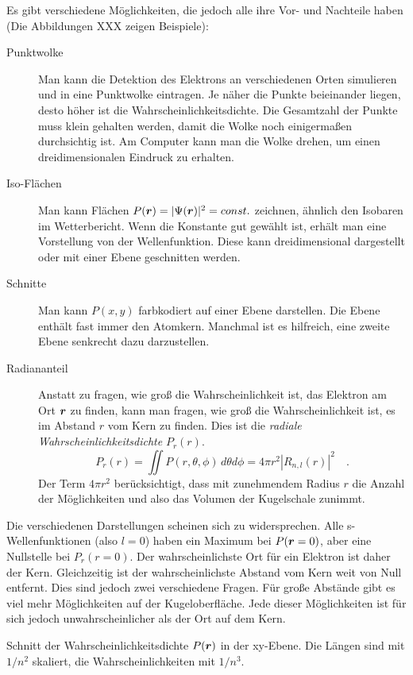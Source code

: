 Es gibt verschiedene Möglichkeiten, die jedoch alle ihre Vor- und Nachteile haben (Die Abbildungen XXX zeigen Beispiele):
\begin{description}
    \item[Punktwolke] Man kann die Detektion des Elektrons an verschiedenen Orten simulieren und in eine Punktwolke eintragen. Je näher die Punkte beieinander liegen, desto höher ist die Wahrscheinlichkeitsdichte. Die Gesamtzahl der Punkte muss klein gehalten werden, damit die Wolke noch einigermaßen durchsichtig ist. Am Computer kann man die Wolke drehen, um einen dreidimensionalen Eindruck zu erhalten.
    \item[Iso-Flächen] Man kann Flächen $P(\boldsymbol{r}) = |\Psi(\boldsymbol{r})|^2 = const.$ zeichnen, ähnlich den Isobaren im Wetterbericht. Wenn die Konstante gut gewählt ist, erhält man eine Vorstellung von der Wellenfunktion. Diese kann dreidimensional dargestellt oder mit einer Ebene geschnitten werden.
    \item[Schnitte] Man kann $P(x,y)$ farbkodiert auf einer Ebene darstellen. Die Ebene enthält fast immer den Atomkern. Manchmal ist es hilfreich, eine zweite Ebene senkrecht dazu darzustellen.
    \item[Radiananteil] Anstatt zu fragen, wie groß die Wahrscheinlichkeit ist, das Elektron am Ort $\boldsymbol{r}$ zu finden, kann man fragen, wie groß die Wahrscheinlichkeit ist, es im Abstand $r$ vom Kern zu finden. Dies ist die \emph{radiale Wahrscheinlichkeitsdichte} $P_r(r)$.
    \begin{equation}
        P_r(r) = \iint P(r, \theta, \phi) \, d\theta d\phi = 4 \pi r^2 |R_{n,l}(r)|^2 \quad .
    \end{equation}
    Der Term $4 \pi r^2$ berücksichtigt, dass mit zunehmendem Radius $r$ die Anzahl der Möglichkeiten und also das Volumen der Kugelschale zunimmt.
\end{description}


Die verschiedenen Darstellungen scheinen sich zu widersprechen. Alle s-Wellenfunktionen (also $l=0$) haben ein Maximum bei $P(\boldsymbol{r} = 0)$, aber eine Nullstelle bei $P_r(r=0)$. Der wahrscheinlichste Ort für ein Elektron ist daher der Kern. Gleichzeitig ist der wahrscheinlichste Abstand vom Kern weit von Null entfernt.  Dies sind jedoch zwei verschiedene Fragen.  Für große Abstände gibt es viel mehr Möglichkeiten auf der Kugeloberfläche. Jede dieser Möglichkeiten ist für sich jedoch unwahrscheinlicher als der Ort auf dem Kern.

\begin{marginfigure}
    \caption{Schnitt der Wahrscheinlichkeitsdichte $P(\boldsymbol{r})$ in der xy-Ebene. Die Längen sind mit $1/n^2$ skaliert, die Wahrscheinlichkeiten mit $1/n^3$.}
\end{marginfigure}

